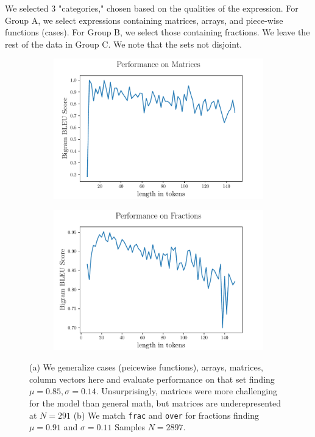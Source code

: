 \documentclass[12pt]{article}
\begin{document}
We selected 3 "categories," chosen based on the qualities of the expression. For
Group A, we select expressions containing matrices, arrays, and piece-wise
functions (cases). For Group B, we select those containing fractions. We leave
the rest of the data in Group C. We note that the sets not disjoint.
\begin{figure}[h]
	\begin{subfigure}{0.5\textwidth}
    \includegraphics[scale=.425]{scorebylenstacked.pdf}
    \centering
		\caption{}
	\end{subfigure}
  \begin{subfigure}{0.5\textwidth}
    \centering
		\includegraphics[scale=.425]{scorebyfrac.pdf}
		\caption{}
  \end{subfigure}
  \caption[Model]{(a) We generalize cases (peicewise functions), arrays,
  matrices, column vectors here and evaluate performance on that set finding
  $\mu = 0.85, \sigma=0.14$. Unsurprisingly, matrices were more challenging for
  the model than general math, but matrices are underepresented at $N=291$ (b)
  We match \texttt{frac} and \texttt{over} for fractions finding $\mu = 0.91$
  and $\sigma =0.11$ Samples $N = 2897$.}
\end{figure}
\end{document}

